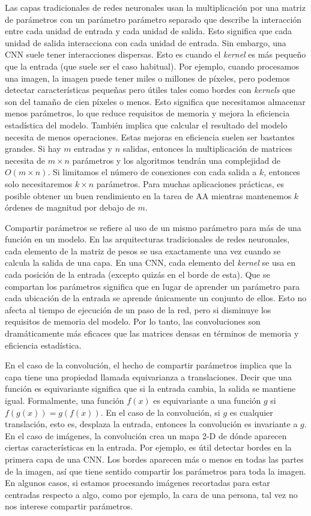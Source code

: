 Las capas tradicionales de redes neuronales usan la multiplicación por una matriz de parámetros con un parámetro parámetro separado que describe la interacción entre cada unidad de entrada y cada unidad de salida. Esto significa que cada unidad de salida interacciona con cada unidad de entrada. Sin embargo, una \ac{CNN} suele tener interacciones dispersas. Esto es cuando el \textit{kernel} es más pequeño que la entrada (que suele ser el caso habitual). Por ejemplo, cuando procesamos una imagen, la imagen puede tener miles o millones de píxeles, pero podemos detectar características pequeñas pero útiles tales como bordes con \textit{kernels} que son del tamaño de cien píxeles o menos. Esto significa que necesitamos almacenar menos parámetros, lo que reduce requisitos de memoria y mejora la eficiencia estadística del modelo. También implica que calcular el resultado del modelo necesita de menos operaciones. Estas mejoras en eficiencia suelen ser bastantes grandes. Si hay $m$ entradas y $n$ salidas, entonces la multiplicación de matrices necesita de $m \times n$ parámetros y los algoritmos tendrán una complejidad de $O(m \times n)$. Si limitamos el número de conexiones con cada salida a $k$, entonces solo necesitaremos $k \times n$ parámetros. Para muchas aplicaciones prácticas, es posible obtener un buen rendimiento en la tarea de \ac{AA} mientras mantenemos $k$ órdenes de magnitud por debajo de $m$.

Compartir parámetros se refiere al uso de un mismo parámetro para más de una función en un modelo. En las arquitecturas tradicionales de redes neuronales, cada elemento de la matriz de pesos se usa exactamente una vez cuando se calcula la salida de una capa. En una \ac{CNN}, cada elemento del \textit{kernel} se usa en cada posición de la entrada (excepto quizás en el borde de esta). Que se compartan los parámetros significa que en lugar de aprender un parámetro para cada ubicación de la entrada se aprende únicamente un conjunto de ellos. Esto no afecta al tiempo de ejecución de un paso de la red, pero si disminuye los requisitos de memoria del modelo. Por lo tanto, las convoluciones son dramáticamente más eficaces que las matrices densas en términos de memoria y eficiencia estadística.

En el caso de la convolución, el hecho de compartir parámetros implica que la capa tiene una propiedad llamada equivarianza a translaciones. Decir que una función es equivariante significa que si la entrada cambia, la salida se mantiene igual. Formalmente, una función $f(x)$ es equivariante a una función $g$ si $f(g(x))=g(f(x))$. En el caso de la convolución, si $g$ es cualquier translación, esto es, desplaza la entrada, entonces la convolución es invariante a $g$. En el caso de imágenes, la convolución crea un mapa 2-D de dónde aparecen ciertas características en la entrada. Por ejemplo, es útil detectar bordes en la primera capa de una \ac{CNN}. Los bordes aparecen más o menos en todas las partes de la imagen, así que tiene sentido compartir los parámetros para toda la imagen. En algunos casos, si estamos procesando imágenes recortadas para estar centradas respecto a algo, como por ejemplo, la cara de una persona, tal vez no nos interese compartir parámetros.


